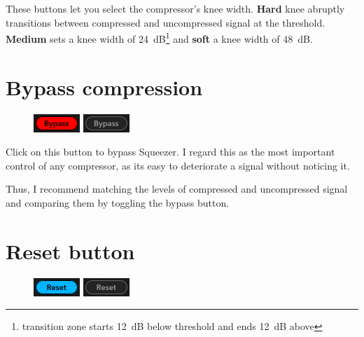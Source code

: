 These buttons let you select the compressor's knee width.
\textbf{Hard} knee abruptly transitions between compressed and
uncompressed signal at the threshold.  \textbf{Medium} sets a knee
width of \SI{24}{\dB}\footnote{transition zone starts \SI{12}{\dB}
  below threshold and ends \SI{12}{\dB} above} and \textbf{soft} a
knee width of \SI{48}{\dB}.

\section{Bypass compression}

\begin{figure}
  \includegraphics[scale=\screenshotscale,clip]{include/images/button_bypass_on.png}
  \newline \vspace{-0.9\baselineskip}
  \includegraphics[scale=\screenshotscale,clip]{include/images/button_bypass_off.png}
\end{figure}

Click on this button to bypass Squeezer.  I regard this as the most
important control of any compressor, as its easy to deteriorate a
signal without noticing it.

Thus, I recommend matching the levels of compressed and uncompressed
signal and comparing them by toggling the bypass button.

\section{Reset button}

\begin{figure}
  \includegraphics[scale=\screenshotscale,clip]{include/images/button_reset_on.png}
  \newline \vspace{-0.9\baselineskip}
  \includegraphics[scale=\screenshotscale,clip]{include/images/button_reset_off.png}
\end{figure}

